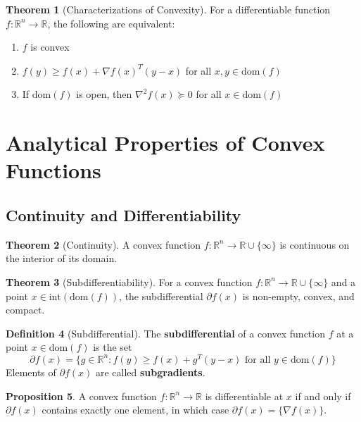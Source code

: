 \documentclass[12pt,a4paper]{article}
\theoremstyle{definition}
\newtheorem{theorem}{Theorem}[section]
\newtheorem{proposition}[theorem]{Proposition}
\newtheorem{definition}[theorem]{Definition}
\begin{document}
\begin{theorem}[Characterizations of Convexity]
For a differentiable function $f: \mathbb{R}^n \to \mathbb{R}$, the following are equivalent:
\begin{enumerate}[label=(\roman*)]
\item $f$ is convex
\item $f(y) \geq f(x) + \nabla f(x)^T(y-x)$ for all $x, y \in \text{dom}(f)$
\item If $\text{dom}(f)$ is open, then $\nabla^2 f(x) \succeq 0$ for all $x \in \text{dom}(f)$
\end{enumerate}
\end{theorem}

\section{Analytical Properties of Convex Functions}

\subsection{Continuity and Differentiability}

\begin{theorem}[Continuity]
A convex function $f: \mathbb{R}^n \to \mathbb{R} \cup \{\infty\}$ is continuous on the interior of its domain.
\end{theorem}

\begin{theorem}[Subdifferentiability]
For a convex function $f: \mathbb{R}^n \to \mathbb{R} \cup \{\infty\}$ and a point $x \in \text{int}(\text{dom}(f))$, the subdifferential $\partial f(x)$ is non-empty, convex, and compact.
\end{theorem}

\begin{definition}[Subdifferential]
The \textbf{subdifferential} of a convex function $f$ at a point $x \in \text{dom}(f)$ is the set
\[\partial f(x) = \{g \in \mathbb{R}^n : f(y) \geq f(x) + g^T(y-x) \text{ for all } y \in \text{dom}(f)\}\]
Elements of $\partial f(x)$ are called \textbf{subgradients}.
\end{definition}

\begin{proposition}
A convex function $f: \mathbb{R}^n \to \mathbb{R}$ is differentiable at $x$ if and only if $\partial f(x)$ contains exactly one element, in which case $\partial f(x) = \{\nabla f(x)\}$.
\end{proposition}
\end{document}
